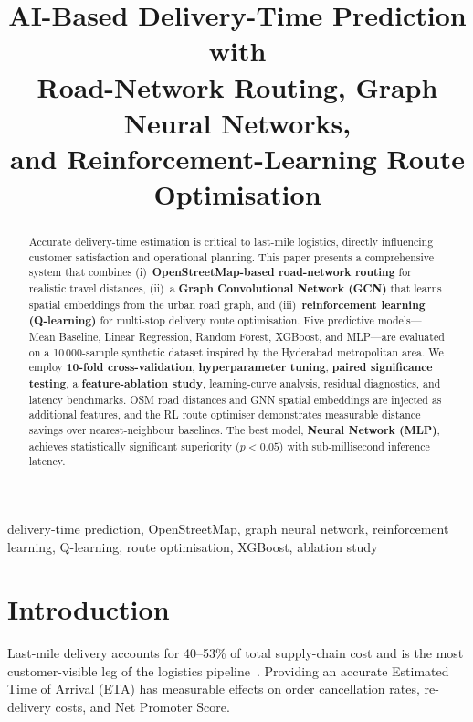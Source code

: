 \documentclass[conference]{IEEEtran}
\title{AI-Based Delivery-Time Prediction with\\
Road-Network Routing, Graph Neural Networks,\\and Reinforcement-Learning Route Optimisation}
\author{
\IEEEauthorblockN{Student Author}
\IEEEauthorblockA{Department of Computer Science\\
University Name, City\\
\texttt{author@university.edu}}
}
\begin{document}
\maketitle

\begin{abstract}
Accurate delivery-time estimation is critical to last-mile logistics, directly
influencing customer satisfaction and operational planning.  This paper
presents a comprehensive system that combines (i)~\textbf{OpenStreetMap-based
road-network routing} for realistic travel distances, (ii)~a \textbf{Graph
Convolutional Network (GCN)} that learns spatial embeddings from the urban road
graph, and (iii)~\textbf{reinforcement learning (Q-learning)} for multi-stop
delivery route optimisation.  Five predictive models---Mean Baseline, Linear
Regression, Random Forest, XGBoost, and MLP---are evaluated on a
10\,000-sample synthetic dataset inspired by the Hyderabad metropolitan area.
We employ \textbf{10-fold cross-validation}, \textbf{hyperparameter tuning},
\textbf{paired significance testing}, a \textbf{feature-ablation study},
learning-curve analysis, residual diagnostics, and latency benchmarks.
OSM road distances and GNN spatial embeddings are injected as additional
features, and the RL route optimiser demonstrates measurable distance savings
over nearest-neighbour baselines.  The best model, \textbf{Neural Network (MLP)},
achieves statistically significant superiority ($p<0.05$) with sub-millisecond
inference latency.
\end{abstract}

\begin{IEEEkeywords}
delivery-time prediction, OpenStreetMap, graph neural network, reinforcement
learning, Q-learning, route optimisation, XGBoost, ablation study
\end{IEEEkeywords}

\section{Introduction}
\label{sec:intro}

Last-mile delivery accounts for 40–53\% of total supply-chain cost and is
the most customer-visible leg of the logistics pipeline~\cite{mangiaracina2019}.
Providing an accurate Estimated Time of Arrival (ETA) has measurable effects on
order cancellation rates, re-delivery costs, and Net Promoter Score.
\end{document}
